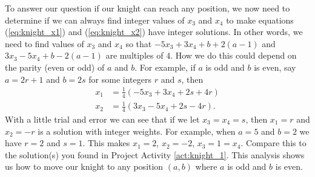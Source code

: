 To answer our question if our knight can reach any position, we now need to determine if we can always find integer values of $x_3$ and $x_4$ to make equations (\ref{eq:knight_x1}) and (\ref{eq:knight_x2}) have integer solutions. In other words, we need to find values of $x_3$ and $x_4$ so that $-5x_3+3x_4+b+2(a-1)$ and $3x_3-5x_4+b-2(a-1)$ are multiples of $4$. How we do this could depend on the parity (even or odd) of $a$ and $b$. For example, if $a$ is odd and $b$ is even, say $a = 2r+1$ and $b = 2s$ for some integers $r$ and $s$, then
\begin{align*}
x_1 &= \frac{1}{4}\left( -5x_3 + 3x_4 + 2s + 4r\right) \\
x_2 &= \frac{1}{4}\left( 3x_3 - 5x_4 + 2s - 4r \right).
\end{align*}
With a little trial and error we can see that if we let $x_3 = x_4 = s$, then $x_1 = r$ and $x_2 = -r$ is a solution with integer weights. For example, when $a=5$ and $b=2$ we have $r=2$ and $s = 1$. This makes $x_1 = 2$, $x_2 = -2$, $x_3 = 1 = x_4$. Compare this to the solution(s) you found in Project Activity \ref{act:knight_1}. This analysis shows us how to move our knight to any position $(a,b)$ where $a$ is odd and $b$ is even.

